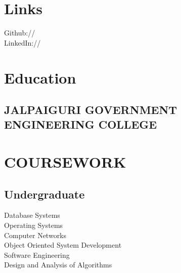 \documentclass[]{deedy-resume-openfont}
\begin{document}
\begin{minipage}[t]{0.32\textwidth}

\section{Links} 
Github:// \href{https://github.com/koushikxoro}{} \\
LinkedIn://  \href{https://www.linkedin.com/in/koushik-mondal-b7a35312b/}{} \\

\sectionsep


\section{Education} 

\subsection{JALPAIGURI GOVERNMENT ENGINEERING COLLEGE}
\sectionsep

\section{COURSEWORK}
\subsection{Undergraduate}
Database Systems \\
Operating Systems \\
Computer Networks \\
Object Oriented System Development \\
Software Engineering \\
Design and Analysis of Algorithms \\
\sectionsep



%
%

\end{minipage} 
\hfill
\end{document}
